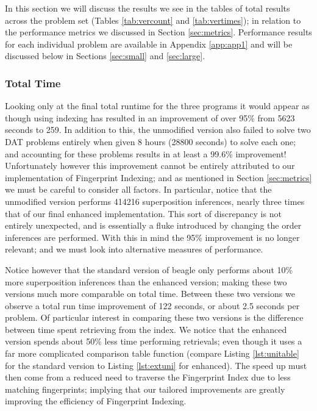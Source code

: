 In this section we will discuss the results we see in the tables of total results
across the problem set (Tables \ref{tab:vercount} and \ref{tab:vertimes}); in
relation to the performance metrics we discussed in Section \ref{sec:metrics}.
Performance results for each individual problem are available in Appendix \ref{app:app1}
and will be discussed below in Sections \ref{sec:small} and \ref{sec:large}.

\subsubsection{Total Time}
Looking only at the final total runtime for the three programs it would appear as
though using indexing has resulted in an improvement of over 95\% from 5623 seconds
to 259. In addition to this, the unmodified version also failed to solve two
DAT problems entirely when given 8 hours (28800 seconds) to solve each one; and accounting
for these problems results in at least a 99.6\% improvement!
Unfortunately however this improvement cannot be entirely attributed to
our implementation of Fingerprint Indexing; and as mentioned in Section \ref{sec:metrics}
we must be careful to consider all factors. In particular, notice that the unmodified
version performs 414216 superposition inferences, nearly three times that of our
final enhanced implementation. This sort of discrepancy is not entirely unexpected,
and is essentially a fluke introduced by changing the order inferences are performed.
With this in mind the 95\% improvement is no longer relevant; and we must look into alternative
measures of performance.

Notice however that the standard version of beagle only performs about 10\% more
superposition inferences than the enhanced version; making these two versions much more comparable
on total time. Between these two versions we observe a total run time improvement
of 122 seconds, or about 2.5 seconds per problem. Of particular interest in comparing
these two versions is the difference between time spent retrieving from the index.
We notice that the enhanced version spends about 50\% less time performing retrievals;
even though it uses a far more complicated comparison table function (compare Listing
\ref{lst:unitable} for the standard version to Listing \ref{lst:extuni} for enhanced).
The speed up must then come from a reduced need to traverse the Fingerprint Index
due to less matching fingerprints; implying that our tailored improvements are greatly
improving the efficiency of Fingerprint Indexing.


